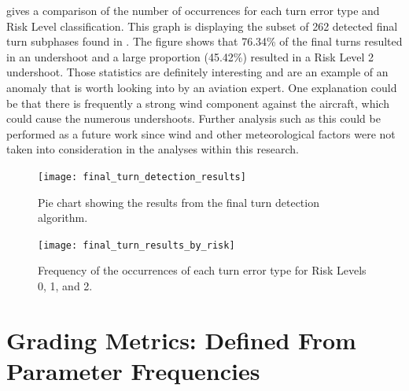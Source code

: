              gives a comparison of the number of occurrences for each turn error type and Risk Level classification.  This graph is displaying the subset of 262 detected final turn subphases found in .  The figure shows that 76.34\% of the final turns resulted in an undershoot and a large proportion (45.42\%) resulted in a Risk Level 2 undershoot.  Those statistics are definitely interesting and are an example of an anomaly that is worth looking into by an aviation expert.  One explanation could be that there is frequently a strong wind component against the aircraft, which could cause the numerous undershoots.  Further analysis such as this could be performed as a future work since wind and other meteorological factors were not taken into consideration in the analyses within this research.
            
            \begin{figure}
            	\centering
                \texttt{[image: final\_turn\_detection\_results]}
                \caption{Pie chart showing the results from the final turn detection algorithm.}
                \label{fig:final_turn_results_ratios}
            \end{figure}
            
            \begin{figure}
            	\centering
                \texttt{[image: final\_turn\_results\_by\_risk]}
                \caption{Frequency of the occurrences of each turn error type for Risk Levels 0, 1, and 2.}
                \label{fig:final_turn_results_by_risk}
            \end{figure}
            
        
        


\section{Grading Metrics:  Defined From Parameter Frequencies}

